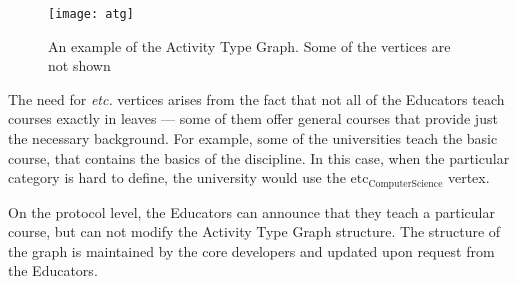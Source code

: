 \begin{figure}[ht]
\centering
\texttt{[image: atg]}
\caption{An example of the Activity Type Graph. Some of the vertices are not shown}
\label{fig:atg}
\end{figure}

The need for \textit{etc.} vertices arises from the fact that not all of the Educators teach courses exactly in leaves — some of them offer general courses that provide just the necessary background. For example, some of the universities teach the basic  course, that contains the basics of the discipline. In this case, when the particular category is hard to define, the university would use the $\textrm{etc}_{\textrm{ComputerScience}}$ vertex.

On the protocol level, the Educators can announce that they teach a particular course, but can not modify the Activity Type Graph structure. The structure of the graph is maintained by the core developers and updated upon request from the Educators.
